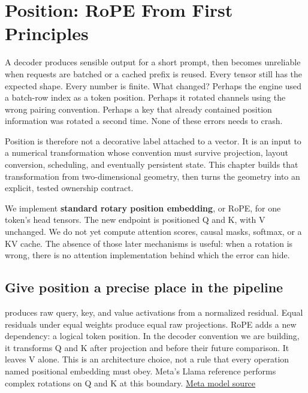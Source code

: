 \chapter{Position: RoPE From First Principles}\label{chapter-9---position-rope-from-first-principles}\label{app:rope}
A decoder produces sensible output for a short prompt, then becomes
unreliable when requests are batched or a cached prefix is reused. Every
tensor still has the expected shape. Every number is finite. What
changed? Perhaps the engine used a batch-row index as a token position.
Perhaps it rotated channels using the wrong pairing convention. Perhaps
a key that already contained position information was rotated a second
time. None of these errors needs to crash.

Position is therefore not a decorative label attached to a vector. It is
an input to a numerical transformation whose convention must survive
projection, layout conversion, scheduling, and eventually persistent
state. This chapter builds that transformation from two-dimensional
geometry, then turns the geometry into an explicit, tested ownership
contract.

We implement \textbf{standard rotary position embedding}, or RoPE, for
one token's head tensors. The new endpoint is positioned Q and K, with V
unchanged. We do not yet compute attention scores, causal masks,
softmax, or a KV cache. The absence of those later mechanisms is useful:
when a rotation is wrong, there is no attention implementation behind
which the error can hide.

\section{Give position a precise place in the
pipeline}\label{give-position-a-precise-place-in-the-pipeline}


 produces raw query, key, and value activations from a
normalized residual. Equal residuals under equal weights produce equal
raw projections. RoPE adds a new dependency: a logical token position.
In the decoder convention we are building, it transforms Q and K after
projection and before their future comparison. It leaves V alone. This
is an architecture choice, not a rule that every operation named
positional embedding must obey. Meta's Llama reference performs complex
rotations on Q and K at this boundary.
\href{https://raw.githubusercontent.com/meta-llama/llama-models/main/models/llama3/model.py}{Meta
model source}

